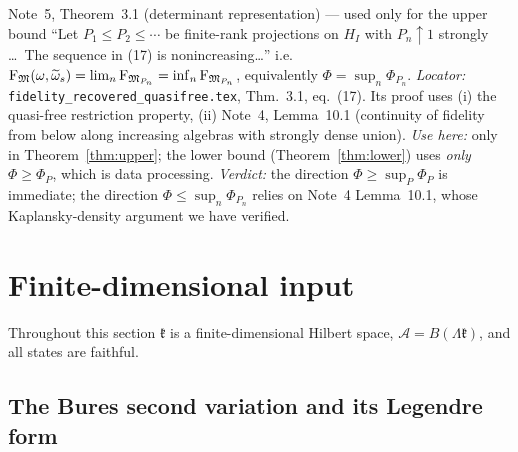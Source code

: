 \documentclass[11pt]{article}
\theoremstyle{definition}\newtheorem{problem}[theorem]{Problem}
\begin{document}
\begin{citedbox}{Note~5, Theorem~3.1 (determinant representation) --- used only for the upper bound}
``Let \(P_1\le P_2\le\cdots\) be finite-rank projections on \(H_I\) with \(P_n\uparrow1\) strongly
\dots\ The sequence in (17) is nonincreasing\dots'' i.e.
\(\operatorname{F}_{\mathfrak M}(\omega,\widetilde\omega_s)=\lim_n\operatorname{F}_{\mathfrak M_{P_n}}=\inf_n\operatorname{F}_{\mathfrak M_{P_n}}\), equivalently
\(\Phi=\sup_n\Phi_{P_n}\).  \emph{Locator:} \texttt{fidelity\_recovered\_quasifree.tex},
Thm.~3.1, eq.~(17).  Its proof uses (i) the quasi-free restriction property, (ii) Note~4,
Lemma~10.1 (continuity of fidelity from below along increasing algebras with strongly dense
union).  \emph{Use here:} only in Theorem~\ref{thm:upper}; the lower bound
(Theorem~\ref{thm:lower}) uses \emph{only} \(\Phi\ge\Phi_P\), which is data processing.
\emph{Verdict:} the direction \(\Phi\ge\sup_P\Phi_P\) is immediate; the direction
\(\Phi\le\sup_n\Phi_{P_n}\) relies on Note~4 Lemma~10.1, whose Kaplansky-density argument we have
verified.
\end{citedbox}

\section{Finite-dimensional input}\label{sec:fd}

Throughout this section \(\mathfrak k\) is a finite-dimensional Hilbert space,
\(\mathcal A=B(\Lambda\mathfrak k)\), and all states are faithful.

\subsection{The Bures second variation and its Legendre form}
\end{document}
